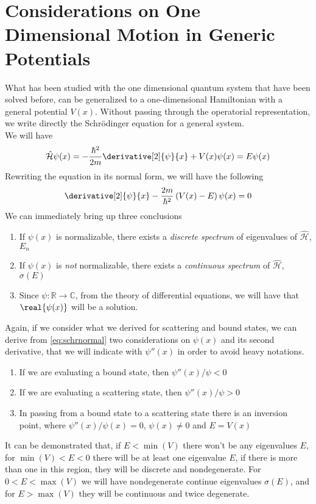 \documentclass[a4paper, 11pt]{book}
\newcommand{\1}{\opr{\mathds{1}}}
\newcommand{\ham}{\mathcal{H}}
\newcommand{\opr}[1]{\hat{#1}}
\theoremstyle{plain}
\begin{document}
	\section{Considerations on One Dimensional Motion in Generic Potentials}
	What has been studied with the one dimensional quantum system that have been solved before, can be generalized to a one-dimensional Hamiltonian with a general potential $V(x)$. Without passing through the operatorial representation, we write directly the Schrödinger equation for a general system.\\
	We will have
	\begin{equation*}
		\opr{\ham}\psi(x)=-\frac{\hbar^2}{2m}\derivative[2]{\psi}{x}+V(x)\psi(x)=E\psi(x)
	\end{equation*}
	Rewriting the equation in its normal form, we will have the following
	\begin{equation}
		\derivative[2]{\psi}{x}-\frac{2m}{\hbar^2}\left( V(x)-E \right)\psi(x)=0
		\label{eq:schrnormal}
	\end{equation}
	We can immediately bring up three conclusions
	\begin{enumerate}
	\item If $\psi(x)$ is normalizable, there exists a \textit{discrete spectrum} of eigenvalues of $\opr{\ham}$, $E_n$
	\item If $\psi(x)$ is \emph{not} normalizable, there exists a \textit{continuous spectrum} of $\opr{\ham}$, $\sigma(E)$
	\item Since $\psi:\mathbb{R}\to\mathbb{C}$, from the theory of differential equations, we will have that $\real{\psi(x)}$ will be a solution.\\
	\end{enumerate}
	Again, if we consider what we derived for scattering and bound states, we can derive from \eqref{eq:schrnormal} two considerations on $\psi(x)$ and its second derivative, that we will indicate with $\psi''(x)$ in order to avoid heavy notations.
	\begin{enumerate}
	\item If we are evaluating a bound state, then $\psi''(x)/\psi<0$
	\item If we are evaluating a scattering state, then $\psi''(x)/\psi>0$
	\item In passing from a bound state to a scattering state there is an inversion point, where $\psi''(x)/\psi(x)=0$, $\psi(x)\ne0$ and $E=V(x)$
	\end{enumerate}
	It can be demonstrated that, if $E<\min(V)$ there won't be any eigenvalues $E$, for $\min(V)<E<0$ there will be at least one eigenvalue $E$, if there is more than one in this region, they will be discrete and nondegenerate. For $0<E<\max(V)$ we will have nondegenerate continue eigenvalues $\sigma(E)$, and for $E>\max(V)$ they will be continuous and twice degenerate.\\
\end{document}
